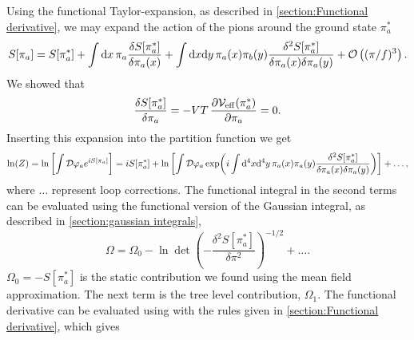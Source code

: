 Using the functional Taylor-expansion, as described in \autoref{section:Functional derivative}, we may expand the action of the pions around the ground state $\pi_a^* $
\begin{equation}
    S[\pi_a]
    = 
    S[\pi_a^*] 
    + \int \dd x \, \pi_a  \frac{\delta S[\pi_a^*]}{\delta \pi_a(x)}
    + \int \dd x \dd y \, \pi_a(x) \pi_b(y)
    \frac{\delta^2 S[\pi_a^*]}{\delta \pi_a(x) \delta \pi_a(y)}
    + \Oh[3]{(\pi/f)}.
\end{equation} 
We showed that
\begin{equation}
    \frac{\delta S[\pi_a^*]}{\delta \pi_a} = -VT\, \diffp{\Veff(\pi_a^*)}{\pi_a} = 0.
\end{equation}
Inserting this expansion into the partition function we get
\begin{equation}
    \ln(Z) = \ln\left[ \int \D \varphi_a e^{i S[\pi_a]} \right]
    = i S[\pi_a^*] + \ln\left[
        \int \D \varphi_a 
        \exp(
            i \int \dd^4 x \dd^4 y \, \pi_a(x) \pi_a(y)
            \frac{\delta^2 S[\pi_a^*]}{\delta \pi_a(x) \delta \pi_a(y)}
            ) 
    \right]
    + \dots,
\end{equation}
where $\dots$ represent loop corrections.
The functional integral in the second terms can be evaluated using the functional version of the Gaussian integral, as described in \autoref{section:gaussian integrals},
\begin{equation}
    \label{Free energy to second order}
    \Omega 
    = \Omega_0
    - \ln{\det\left( - \frac{\delta^2 S[\pi_a^*]}{\delta \pi^2} \right)}^{-1/2}+ \dots.
\end{equation}
$\Omega_0 = -S[\pi_a^* ]$ is the static contribution we found using the mean field approximation.
The next term is the tree level contribution, $\Omega_1$.
The functional derivative can be evaluated using with the rules given in \autoref{section:Functional derivative}, which gives
